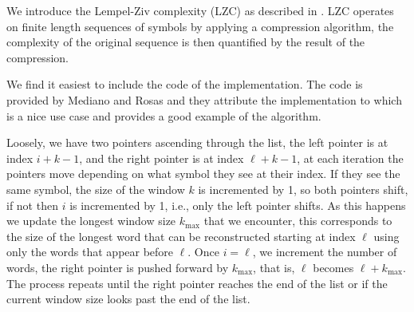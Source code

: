 We introduce the Lempel-Ziv complexity (LZC) as described in \cite{LZ76}. LZC operates on finite length sequences of symbols by applying a compression algorithm, the complexity of the original sequence is then quantified by the result of the compression.

We find it easiest to include the code of the implementation. The code is provided by Mediano and Rosas \cite{MedianoRosas2019} and they attribute the implementation to \cite{Kaspar1987EasilyCM} which is a nice use case and provides a good example of the algorithm.



Loosely, we have two pointers ascending through the list, the left pointer is at index $i+k-1$, and the right pointer is at index $\ell+k-1$, at each iteration the pointers move depending on what symbol they see at their index. If they see the same symbol, the size of the window $k$ is incremented by 1, so both pointers shift, if not then $i$ is incremented by 1, i.e., only the left pointer shifts. As this happens we update the longest window size $k_\text{max}$ that we encounter, this corresponds to the size of the longest word that can be reconstructed starting at index $\ell$ using only the words that appear before $\ell$. Once $i=\ell$, we increment the number of words, the right pointer is pushed forward by $k_\text{max}$, that is, $\ell$ becomes $\ell+k_\text{max}$. The process repeats until the right pointer reaches the end of the list or if the current window size looks past the end of the list.

